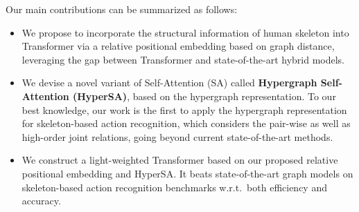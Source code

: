 \documentclass[10pt,twocolumn,letterpaper]{article}
\begin{document}
Our main contributions can be summarized as follows:
\begin{itemize}
    \item We propose to incorporate the structural information of human skeleton into Transformer via a relative positional embedding based on graph distance, leveraging the gap between Transformer and state-of-the-art hybrid models. 
    
    \item We devise a novel variant of Self-Attention (SA) called \textbf{Hypergraph Self-Attention (HyperSA)}, based on the hypergraph representation. 
    To our best knowledge, our work is the first to apply the hypergraph representation for skeleton-based action recognition, which considers the pair-wise as well as high-order joint relations, going beyond current state-of-the-art methods. 
    
    \item We construct a light-weighted Transformer based on our proposed relative positional embedding and HyperSA. It beats state-of-the-art graph models on skeleton-based action recognition benchmarks w.r.t.~both efficiency and accuracy.
\end{itemize}


\end{document}
